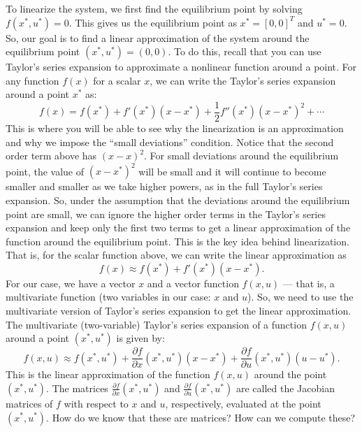\documentclass{ee122_notes}
\begin{document}
To linearize the system, we first find the equilibrium point by solving $f(x^*, u^*) = 0$. This gives us the equilibrium point as $x^* = [0, 0]^T$ and $u^* = 0$. So, our goal is to find a linear approximation of the system around the equilibrium point $(x^*, u^*) = (0,0)$. To do this, recall that you can use Taylor's series expansion to approximate a nonlinear function around a point. For any function $f(x)$ for a scalar $x$, we can write the Taylor's series expansion around a point $x^*$ as:
\[
f(x) = f(x^*) + f'(x^*)(x - x^*) + \frac{1}{2}f''(x^*)(x - x^*)^2 + \cdots
\]
This is where you will be able to see why the linearization is an approximation and why we impose the ``small deviations'' condition. Notice that the second order term above has $(x - x)^2$. For small deviations around the equilibrium point, the value of $(x - x^*)^2$ will be small and it will continue to become smaller and smaller as we take higher powers, as in the full Taylor's series expansion. So, under the assumption that the deviations around the equilibrium point are small, we can ignore the higher order terms in the Taylor's series expansion and keep only the first two terms to get a linear approximation of the function around the equilibrium point. This is the key idea behind linearization. That is, for the scalar function above, we can write the linear approximation as 
\[
f(x) \approx f(x^*) + f'(x^*)(x - x^*).
\]
For our case, we have a vector $x$ and a vector function $f(x,u)$ --- that is, a multivariate function (two variables in our case: $x$ and $u$). So, we need to use the multivariate version of Taylor's series expansion to get the linear approximation. The multivariate (two-variable) Taylor's series expansion of a function $f(x,u)$ around a point $(x^*, u^*)$ is given by:
\begin{equation}
    \label{eq:taylor}
f(x,u) \approx f(x^*, u^*) + \frac{\partial f}{\partial x}(x^*, u^*)(x - x^*) + \frac{\partial f}{\partial u}(x^*, u^*)(u - u^*).
\end{equation}
This is the linear approximation of the function $f(x,u)$ around the point $(x^*, u^*)$. The matrices $\frac{\partial f}{\partial x}(x^*, u^*)$ and $\frac{\partial f}{\partial u}(x^*, u^*)$ are called the Jacobian matrices of $f$ with respect to $x$ and $u$, respectively, evaluated at the point $(x^*, u^*)$. How do we know that these are matrices? How can we compute these?
\end{document}
